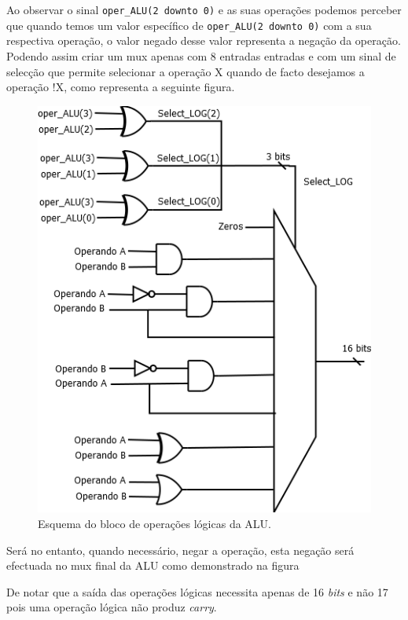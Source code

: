 \documentclass[11pt]{article}
\numberwithin{equation}{section}
\begin{document}
Ao observar o sinal \texttt{oper\_ALU(2 {\footnotesize downto} 0)} e as suas operações podemos perceber que quando temos um valor específico de \texttt{oper\_ALU(2 {\footnotesize downto} 0)} com a sua respectiva operação, o valor negado desse valor representa a negação da operação. Podendo assim criar um mux apenas com 8 entradas entradas e com um sinal de selecção que permite selecionar a operação X quando de facto desejamos a operação !X, como representa a seguinte figura.

\vspace{1mm}

\begin{figure}[H]
	\centering
	\includegraphics[keepaspectratio=true, scale=0.40]{imagens/Log}
	\caption{Esquema do bloco de operações lógicas da ALU.}
	\vspace{-0.8em}
\end{figure}

Será no entanto, quando necessário, negar a operação, esta negação será efectuada no mux final da ALU como demonstrado na figura %

De notar que a saída das operações lógicas necessita apenas de 16 \textit{bits} e não 17 pois uma operação lógica não produz \textit{carry}.
\end{document}
